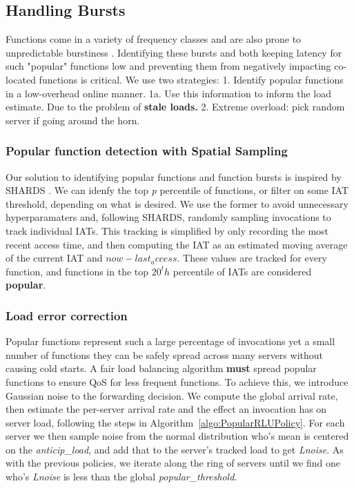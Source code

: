 \subsection{Handling Bursts}

Functions come in a variety of frequency classes and are also prone to unpredictable burstiness \cite{TODO}.
Identifying these bursts and both keeping latency for such "popular" functions low and preventing them from negatively impacting co-located functions is critical.
We use two strategies:
1. Identify popular functions in a low-overhead online manner.
1a. Use this information to inform the load estimate. Due to the problem of \textbf{stale loads.}
2. Extreme overload: pick random server if going around the horn. 

\subsubsection{Popular function detection with Spatial Sampling}

Our solution to identifying popular functions and function bursts is inspired by SHARDS \cite{shards}.
We can idenfy the top \textit{p} percentile of functions, or filter on some IAT threshold, depending on what is desired. 
We use the former to avoid unnecessary hyperparamaters and, following SHARDS, randomly sampling invocations to track individual IATs.
This tracking is simplified by only recording the most recent access time, and then computing the IAT as an estimated moving average of the current IAT and  $now - last_access$.
These values are tracked for every function, and functions in the top $20^th$ percentile of IATs are considered \textbf{popular}.

\subsubsection{Load error correction}

Popular functions represent such a large percentage of invocations yet a small number of functions they can be safely spread across many servers without causing cold starts.
A fair load balancing algorithm \textbf{must} spread popular functions to ensure QoS for less frequent functions.
To achieve this, we introduce Gaussian noise to the forwarding decision.
We compute the global arrival rate, then estimate the per-server arrival rate and the effect an invocation has on server load, following the steps in Algorithm~\ref{algo:PopularRLUPolicy}.
For each server we then sample noise from the normal distribution who's mean is centered on the \textit{anticip\_load}, and add that to the server's tracked load to get \textit{Lnoise}.
As with the previous policies, we iterate along the ring of servers until we find one who's \textit{Lnoise} is less than the global \textit{popular\_threshold}.

